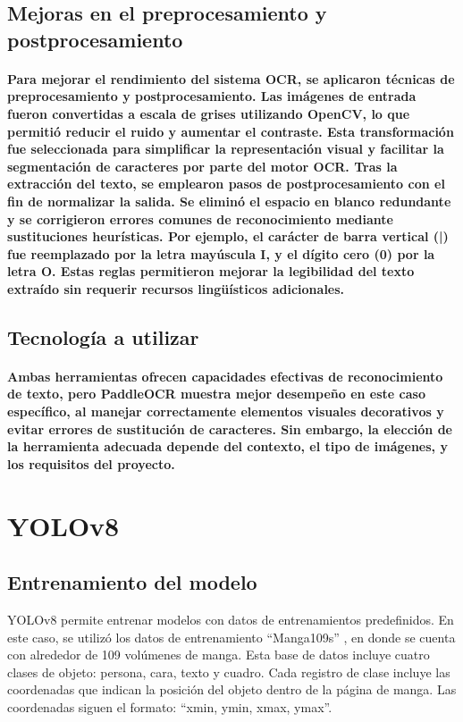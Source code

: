 \documentclass[conference]{IEEEtran}
\begin{document}
\subsection{Mejoras en el preprocesamiento y postprocesamiento}
\paragraph{Para mejorar el rendimiento del sistema OCR, se aplicaron técnicas de preprocesamiento y postprocesamiento. Las imágenes de entrada fueron convertidas a escala de grises utilizando OpenCV, lo que permitió reducir el ruido y aumentar el contraste. Esta transformación fue seleccionada para simplificar la representación visual y facilitar la segmentación de caracteres por parte del motor OCR.
Tras la extracción del texto, se emplearon pasos de postprocesamiento con el fin de normalizar la salida. Se eliminó el espacio en blanco redundante y se corrigieron errores comunes de reconocimiento mediante sustituciones heurísticas. Por ejemplo, el carácter de barra vertical (|) fue reemplazado por la letra mayúscula I, y el dígito cero (0) por la letra O. Estas reglas permitieron mejorar la legibilidad del texto extraído sin requerir recursos lingüísticos adicionales.}

\subsection{Tecnología a utilizar}

\paragraph{Ambas herramientas ofrecen capacidades efectivas de reconocimiento de texto, pero PaddleOCR muestra mejor desempeño en este caso específico, al manejar correctamente elementos visuales decorativos y evitar errores de sustitución de caracteres. Sin embargo, la elección de la herramienta adecuada depende del contexto, el tipo de imágenes, y los requisitos del proyecto.}

\hypertarget{yolov8}{%
\section{YOLOv8}\label{yolov8}}

\subsection{Entrenamiento del modelo}\label{entrenamiento-del-modelo}
YOLOv8 permite entrenar modelos con datos de entrenamientos predefinidos. En este caso, se utilizó los datos de entrenamiento ``Manga109s'' \cite{aizawa2020manga109}, en donde se cuenta con alrededor de 109 volúmenes de manga. Esta base de datos incluye cuatro clases de objeto: persona, cara, texto y cuadro. Cada registro de clase incluye las coordenadas que indican la posición del objeto dentro de la página de manga. Las coordenadas siguen el formato: ``xmin, ymin, xmax, ymax''.
\end{document}
